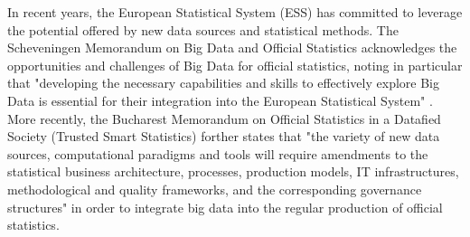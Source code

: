 In recent years, the European Statistical System (ESS) has committed to leverage the potential offered
by new data sources and statistical methods. The Scheveningen Memorandum on Big Data and Official Statistics
acknowledges the opportunities and challenges of Big Data for official statistics,
noting in particular that "developing the necessary capabilities and skills to effectively explore
Big Data is essential for their integration into the European Statistical System" \cite{scheveningen2013}.
More recently, the Bucharest Memorandum on Official Statistics in a Datafied Society (Trusted Smart Statistics)
\cite{bucharest2018} forther states that "the variety of new data sources, computational paradigms and tools
will require amendments to the statistical business architecture, processes, production models, IT
infrastructures, methodological and quality frameworks, and the corresponding governance structures" in order
to integrate big data into the regular production of official statistics.
